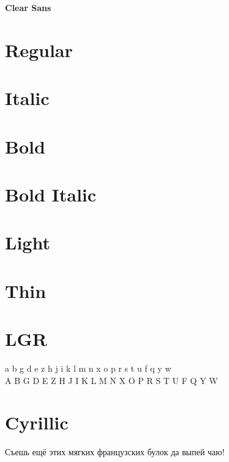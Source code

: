 \documentclass{article}
\begin{document}
\begin{center}\huge\bf Clear Sans
\end{center}


\section*{Regular}
\lipsum[1]

\section*{Italic}
\textit{\lipsum[2]}

\section*{Bold}

\textbf{\lipsum[3]}

\section*{Bold Italic}

\textbf{\textit{\lipsum[4]}}

\section*{Light}

\textsfl{\lipsum[5]}

\section*{Thin}

\textsft{\lipsum[6]}


\section*{LGR}


{\clearlgr\noindent
 a b g d e z h j i k l m n x o p r s t u f q y w\\
 A B G D E Z H J I K L M N X O P R S T U F Q Y W\\
}

\section*{Cyrillic}

{\ifxetex\else\ifluatex\else{}\selectfont\fi\fi

Съешь ещё этих мягких французских булок да
выпей чаю!}
\end{document}
